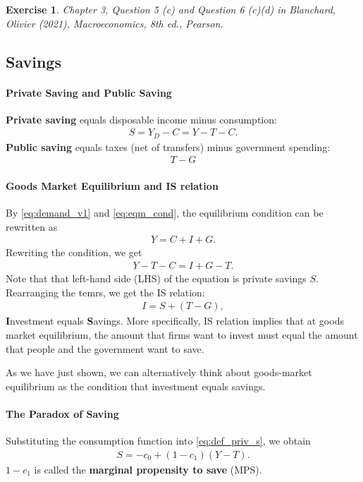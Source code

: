 \documentclass[12pt]{article}
\newtheorem{exercise}{Exercise}
\begin{document}
\vspace{36pt}

\begin{exercise}
    Chapter 3, Question 5 (c) and Question 6 (c)(d) in Blanchard, Olivier (2021), \textit{Macroeconomics}, 8th ed., Pearson.
\end{exercise}

\subsection*{Savings}
\paragraph{Private Saving and Public Saving}
\textbf{Private saving} equals disposable income minus consumption:
\begin{align}\label{eq:def_priv_s}
    S = Y_D - C = Y - T - C.
\end{align}
\textbf{Public saving} equals taxes (net of transfers) minus government spending:
\begin{align*}
    T - G
\end{align*}

\paragraph{Goods Market Equilibrium and IS relation}
By \eqref{eq:demand_v1} and \eqref{eq:eqm_cond}, the equilibrium condition can be rewritten as
\begin{align}\label{eq:eqm_cond_v2}
    Y = C + I + G.
\end{align}
Rewriting the condition, we get
\begin{align*}
    Y - T - C = I + G - T.
\end{align*}
Note that that left-hand side (LHS) of the equation is private savings $S$. Rearranging the temrs, we get the IS relation:
\begin{align*}
    I = S + (T-G),
\end{align*}
\textbf{I}nvestment equals \textbf{S}avings. More specifically, IS relation implies that at goods market equilibrium, the amount that firms want to invest must equal the amount that people and the government want to save.

As we have just shown, we can alternatively think about goods-market equilibrium as the condition that investment equals savings.

\paragraph{The Paradox of Saving}
Substituting the consumption function into \eqref{eq:def_priv_s}, we obtain
\begin{align*}
    S = -c_0 + (1-c_1)(Y-T).
\end{align*}
$1-c_1$ is called the \textbf{marginal propensity to save} (MPS).
\end{document}
